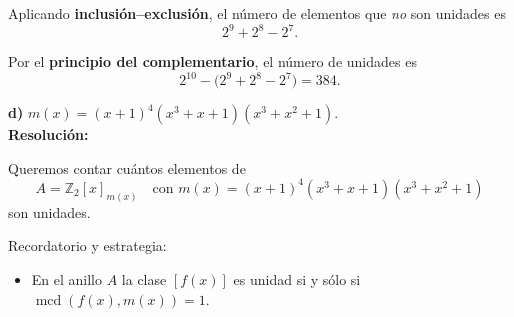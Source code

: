 \documentclass[a4paper,12pt]{article}
\begin{document}
\begin{ejercicio}[title=Ejercicio 10]
Aplicando \textbf{inclusión–exclusión}, el número de elementos que \emph{no} son unidades es
\[
2^{9} + 2^{8} - 2^{7}.
\]

Por el \textbf{principio del complementario}, el número de unidades es
\[
2^{10} - \big(2^{9} + 2^{8} - 2^{7}\big) = \boxed{384}.
\]

\textbf{d)} \quad $m(x)=(x+1)^4 (x^3+x+1)(x^3+x^2+1)$. \\

\textbf{Resolución:}

Queremos contar cuántos elementos de 
\[
A=\mathbb{Z}_2[x]_{m(x)}\quad\text{con }m(x)=(x+1)^4 (x^3+x+1)(x^3+x^2+1)
\]
son unidades.

\vspace{0.5em}

Recordatorio y estrategia:
\begin{itemize}
\item En el anillo \(A\) la clase \([f(x)]\) es unidad si y sólo si \(\operatorname{mcd}(f(x),m(x))=1\).
\end{itemize}
\end{ejercicio}
\end{document}
